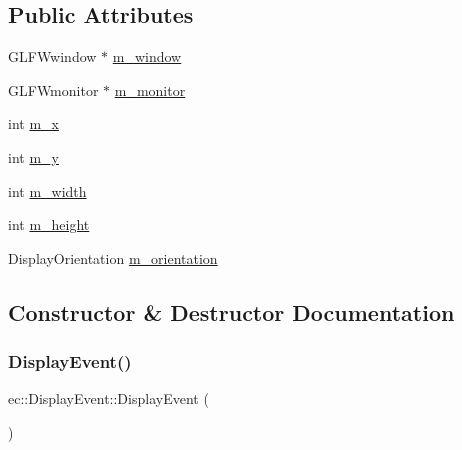 \subsection*{Public Attributes}
\begin{DoxyCompactItemize}
\item 
G\+L\+F\+Wwindow $\ast$ \mbox{\hyperlink{structec_1_1_display_event_a501ab5209368544f1c264b3e25a87185}{m\+\_\+window}}
\item 
G\+L\+F\+Wmonitor $\ast$ \mbox{\hyperlink{structec_1_1_display_event_a2c3ae8a32b9c575f1f567eb3a89985cc}{m\+\_\+monitor}}
\item 
int \mbox{\hyperlink{structec_1_1_display_event_a35b371c7098cc98509f44e6fe2802945}{m\+\_\+x}}
\item 
int \mbox{\hyperlink{structec_1_1_display_event_aa4314e0538f9929b39e37bb400ac2220}{m\+\_\+y}}
\item 
int \mbox{\hyperlink{structec_1_1_display_event_ab14060df4b5ea8295712b58fce89a93a}{m\+\_\+width}}
\item 
int \mbox{\hyperlink{structec_1_1_display_event_a395871be035f491d8e894b7cacc609ba}{m\+\_\+height}}
\item 
Display\+Orientation \mbox{\hyperlink{structec_1_1_display_event_a3d155441337a15fd45aa3584168da059}{m\+\_\+orientation}}
\end{DoxyCompactItemize}


\subsection{Constructor \& Destructor Documentation}
\mbox{\label{structec_1_1_display_event_a34ed8f096607ab02657e3599cd3d3211}} 
\subsubsection{\texorpdfstring{Display\+Event()}{DisplayEvent()}\hspace{0.1cm}{\footnotesize\ttfamily [1/2]}}
{\footnotesize\ttfamily ec\+::\+Display\+Event\+::\+Display\+Event (\begin{DoxyParamCaption}{ }\end{DoxyParamCaption})\hspace{0.3cm}{\ttfamily [explicit]}}

